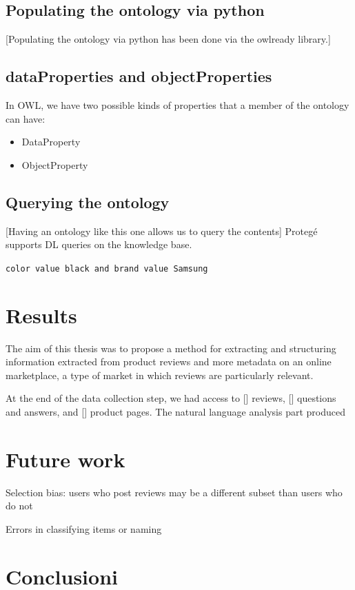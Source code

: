 \documentclass[LaM,binding=0.6cm]{sapthesis}
\begin{document}
\section{Populating the ontology via python}

[Populating the ontology via python has been done via the owlready library.]

\section{dataProperties and objectProperties}

In OWL, we have two possible kinds of properties that a member of the ontology can have:
\begin{itemize}
	\item DataProperty
	\item ObjectProperty
\end{itemize}

\section{Querying the ontology}

[Having an ontology like this one allows us to query the contents]
Protegé supports DL queries on the knowledge base.

\texttt{color value black and brand value Samsung}

\chapter{Results}

The aim of this thesis was to propose a method for extracting and structuring information extracted from product reviews and more metadata on an online marketplace, a type of market in which reviews are particularly relevant.

At the end of the data collection step, we had access to [] reviews, [] questions and answers, and [] product pages. The natural language analysis part produced



\chapter{Future work}

Selection bias: users who post reviews may be a different subset than users who do not

Errors in classifying items or naming

\chapter{Conclusioni}


\backmatter
\cleardoublepage
{}
\end{document}
